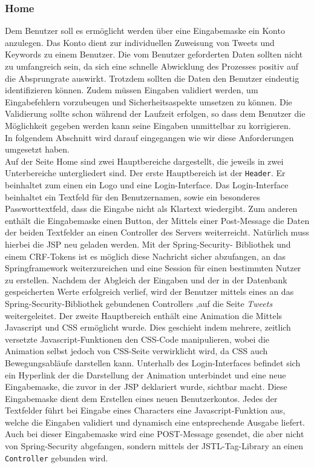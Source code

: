 \subsubsection*{Home}
Dem Benutzer soll es ermöglicht werden über eine Eingabemaske ein Konto anzulegen. Das Konto dient zur 
individuellen Zuweisung von Tweets und Keywords zu einem Benutzer. Die vom Benutzer geforderten Daten 
sollten nicht zu umfangreich sein, da sich eine schnelle Abwicklung des Prozesses positiv auf die 
Absprungrate auswirkt. Trotzdem sollten die Daten den  Benutzer eindeutig identifizieren können. 
Zudem müssen Eingaben validiert werden, um Eingabefehlern vorzubeugen und Sicherheitsaspekte umsetzen 
zu können. Die Validierung sollte schon während der Laufzeit erfolgen, so dass dem Benutzer die 
Möglichkeit gegeben werden kann seine Eingaben unmittelbar zu korrigieren. \\
In folgendem Abschnitt wird darauf eingegangen wie wir diese Anforderungen umgesetzt haben.\\
Auf der Seite Home sind zwei Hauptbereiche dargestellt, die jeweils in zwei Unterbereiche 
untergliedert sind. Der erste Hauptbereich ist der \texttt{Header}. Er beinhaltet zum einen ein Logo 
und eine Login-Interface. 
Das Login-Interface beinhaltet ein Textfeld für den Benutzernamen, sowie ein besonderes 
Passworttextfeld, dass die Eingabe nicht als Klartext wiedergibt. Zum anderen enthält die Eingabemaske 
einen Button, der Mittels einer Post-Message die Daten der beiden Textfelder an einen Controller des 
Servers weiterreicht. Natürlich muss hierbei die JSP neu geladen werden. Mit der Spring-Security-
Bibliothek und einem CRF-Tokens ist es möglich diese Nachricht sicher abzufangen, an das 
Springframework weiterzureichen und eine Session für einen bestimmten Nutzer zu erstellen. Nachdem 
der Abgleich der Eingaben und der in der Datenbank gespeicherten Werte erfolgreich verlief, wird der 
Benutzer mittels eines an das  Spring-Security-Bibliothek gebundenen Controllers ,auf die Seite 
\textit{Tweets} weitergeleitet. 
Der zweite Hauptbereich enthält eine Animation die Mittels Javascript und CSS ermöglicht wurde. Dies 
geschieht indem mehrere, zeitlich versetzte Javascript-Funktionen den CSS-Code manipulieren, wobei die 
Animation selbst jedoch von CSS-Seite verwirklicht wird, da CSS auch Bewegungsabläufe darstellen kann. 
Unterhalb des Login-Interfaces befindet sich ein Hyperlink der die Darstellung der Animation 
unterbindet und eine neue Eingabemaske, die zuvor in der JSP deklariert wurde, sichtbar macht. Diese 
Eingabemaske dient dem Erstellen eines neuen Benutzerkontos. Jedes der Textfelder führt bei Eingabe 
eines Characters  eine Javascript-Funktion aus, welche die Eingaben validiert und dynamisch eine 
entsprechende Ausgabe liefert. Auch bei dieser Eingabemaske wird eine POST-Message gesendet, die aber 
nicht von Spring-Security abgefangen, sondern mittels der JSTL-Tag-Library an einen 
\texttt{Controller} gebunden wird. 

